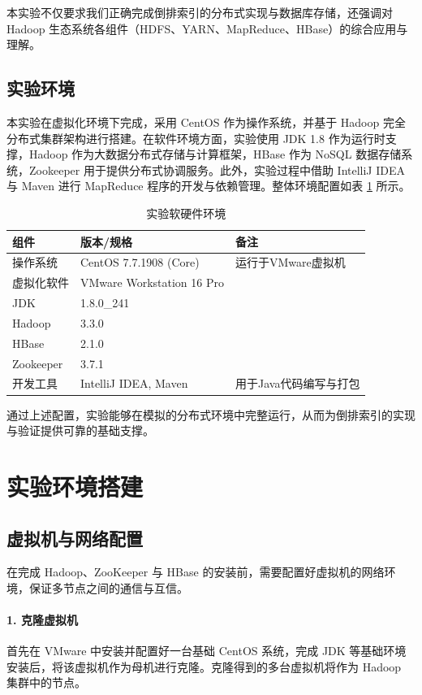 \documentclass[]{bitreport}
\begin{document}
本实验不仅要求我们正确完成倒排索引的分布式实现与数据库存储，还强调对 Hadoop 生态系统各组件（HDFS、YARN、MapReduce、HBase）的综合应用与理解。

\subsection{实验环境}

本实验在虚拟化环境下完成，采用 CentOS 作为操作系统，并基于 Hadoop 完全分布式集群架构进行搭建。在软件环境方面，实验使用 JDK 1.8 作为运行时支撑，Hadoop 作为大数据分布式存储与计算框架，HBase 作为 NoSQL 数据存储系统，Zookeeper 用于提供分布式协调服务。此外，实验过程中借助 IntelliJ IDEA 与 Maven 进行 MapReduce 程序的开发与依赖管理。整体环境配置如表 \ref{tab:exp-env} 所示。

\begin{table}[H]
  \centering
  \caption{实验软硬件环境}
  \label{tab:exp-env}
  \begin{tabular}{lll}
    \toprule
    \textbf{组件} & \textbf{版本/规格} & \textbf{备注} \\
    \midrule
    操作系统 & CentOS 7.7.1908 (Core) & 运行于VMware虚拟机 \\
    虚拟化软件 & VMware Workstation 16 Pro & \\
    JDK & 1.8.0\_241 & \\
    Hadoop & 3.3.0 & \\
    HBase & 2.1.0 & \\
    Zookeeper & 3.7.1 & \\
    开发工具 & IntelliJ IDEA, Maven & 用于Java代码编写与打包 \\
    \bottomrule
  \end{tabular}
\end{table}

通过上述配置，实验能够在模拟的分布式环境中完整运行，从而为倒排索引的实现与验证提供可靠的基础支撑。


\section{实验环境搭建}

\subsection{虚拟机与网络配置}

在完成 Hadoop、ZooKeeper 与 HBase 的安装前，需要配置好虚拟机的网络环境，保证多节点之间的通信与互信。

\paragraph{1. 克隆虚拟机}
首先在 VMware 中安装并配置好一台基础 CentOS 系统，完成 JDK 等基础环境安装后，将该虚拟机作为母机进行克隆。克隆得到的多台虚拟机将作为 Hadoop 集群中的节点。
\end{document}
